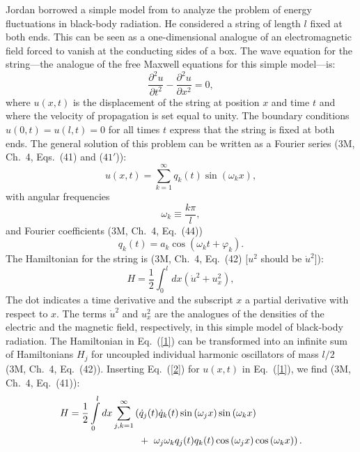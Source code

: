 \documentclass{elsart}
\begin{document}
Jordan borrowed a simple model from \citet[pp.\ 367--373]{Ehrenfest 1925a} to analyze the problem of energy fluctuations in black-body radiation. He considered a string of length $l$ fixed at both ends.  This can be seen as a one-dimensional analogue of an electromagnetic field forced to vanish at the conducting sides of a box. The wave equation for the string---the analogue of the free Maxwell equations for this simple model---is:
\begin{equation}
\frac{\partial^2 u}{\partial t^2} - \frac{\partial^2 u}{\partial x^2} = 0,
\end{equation}
where $u(x, t)$ is the displacement of the string at position $x$ and time $t$ and where the velocity of propagation is set equal to unity. The boundary conditions $u(0,t) = u(l, t) = 0$ for all times $t$ express that the string is fixed at both ends.
The general solution of this problem can be written as a Fourier series (3M, Ch.\ 4, Eqs.\ (41) and ($41'$)):
\begin{equation}
u(x,t) = \sum_{k=1}^\infty q_k(t) \sin{(\omega_k x)},
\label{2}
\end{equation}
with angular frequencies
\begin{equation}
\omega_k \equiv  \frac{k \pi}{l},
\label{3a}
\end{equation}
and  Fourier coefficients (3M, Ch.\ 4, Eq.\ (44)) 
\begin{equation}
q_k(t) = a_k \cos{(\omega_k t + \varphi_k)}.
\label{3}
\end{equation}
The Hamiltonian for the string is (3M, Ch.\ 4, Eq.\ (42) [$u^2$ should be $\dot{u}^2$]):
\begin{equation}
H = \frac{1}{2} \int_0^l dx \left( \dot{u}^2 + u_x^2 \right), 
\label{1}
\end{equation}
The dot indicates a time derivative and the subscript $x$ a partial derivative with respect to $x$. The terms $\dot{u}^2$ and $u_x^2$ are the analogues of the densities of the electric and the magnetic field, respectively, in this simple model of  black-body radiation. 
The Hamiltonian in Eq.\ (\ref{1}) can be transformed into an infinite sum of Hamiltonians $H_j$ for uncoupled individual harmonic oscillators of mass $l/2$ (3M, Ch.\ 4, Eq.\ (42)). Inserting Eq.\ (\ref{2}) for $u(x,t)$ in Eq.\ (\ref{1}),
we find (3M, Ch.\ 4, Eq.\ (41)):
\begin{eqnarray}
\lefteqn{ H  =  \frac{1}{2} \int_0^l dx \sum_{j,k =1}^\infty \left(  \dot{q}_j(t) \dot{q}_k(t)
\sin{(\omega_j x)} \sin{(\omega_k x)}  \right.} \nonumber \\
 & & \;\;\;\;\;\;\;\;\;\;\;\;\;\;\;\;\;\;\;\;\;\;\;\;\;\;  \left.
 + \;\;  \omega_j \omega_k q_j(t) q_k(t) \cos{(\omega_j x)} \cos{(\omega_k x)} \right).
\label{3b}
\end{eqnarray}
\end{document}
